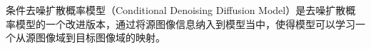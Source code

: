
条件去噪扩散概率模型（Conditional Denoising Diffusion Model）是去噪扩散概率模型的一个改进版本，通过将源图像信息纳入到模型当中，使得模型可以学习一个从源图像域到目标图像域的映射。
